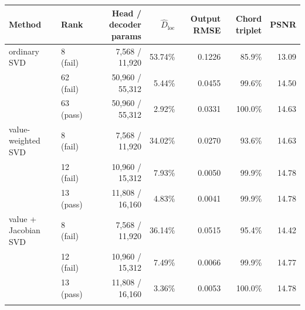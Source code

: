 \begin{tabular}{llrrrrr}
\toprule
Method & Rank & Head / decoder params & $\widehat D_{\mathrm{loc}}$ & Output RMSE & Chord triplet & PSNR \\
\midrule
ordinary SVD & 8 (fail) & 7,568 / 11,920 & 53.74\% & 0.1226 & 85.9\% & 13.09 \\
 & 62 (fail) & 50,960 / 55,312 & 5.44\% & 0.0455 & 99.6\% & 14.50 \\
 & 63 (pass) & 50,960 / 55,312 & 2.92\% & 0.0331 & 100.0\% & 14.63 \\
\addlinespace
value-weighted SVD & 8 (fail) & 7,568 / 11,920 & 34.02\% & 0.0270 & 93.6\% & 14.63 \\
 & 12 (fail) & 10,960 / 15,312 & 7.93\% & 0.0050 & 99.9\% & 14.78 \\
 & 13 (pass) & 11,808 / 16,160 & 4.83\% & 0.0041 & 99.9\% & 14.78 \\
\addlinespace
value + Jacobian SVD & 8 (fail) & 7,568 / 11,920 & 36.14\% & 0.0515 & 95.4\% & 14.42 \\
 & 12 (fail) & 10,960 / 15,312 & 7.49\% & 0.0066 & 99.9\% & 14.77 \\
 & 13 (pass) & 11,808 / 16,160 & 3.36\% & 0.0053 & 100.0\% & 14.78 \\
\addlinespace
\bottomrule
\end{tabular}
